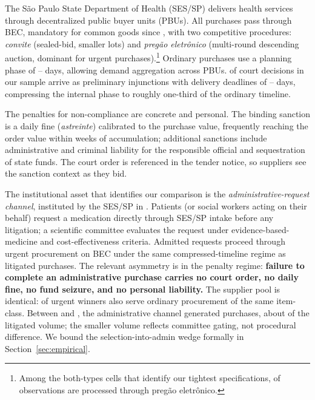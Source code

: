 The S\~ao Paulo State Department of Health (SES/SP) delivers health
services through \BPpbuCount{} decentralized public buyer units
(PBUs). All purchases pass through BEC, mandatory for common goods
since \BPbecMandatorySinceYear, with two competitive procedures:
\textit{convite} (sealed-bid, smaller lots) and \textit{preg\~ao
eletr\^onico} (multi-round descending auction, dominant for urgent
purchases).\footnote{Among the both-types cells that identify our
tightest specifications, \BPbothCellModalityShareBoth{} of
observations are processed through preg\~ao eletr\^onico.} Ordinary
purchases use a planning phase of \BPordPlanLow--\BPordPlanHigh{}
days, allowing demand aggregation across PBUs. \BPinjunctionShare{}
of court decisions in our sample arrive as preliminary injunctions
with delivery deadlines of \BPurgentPlanLow--\BPurgentPlanHigh{}
days, compressing the internal phase to roughly one-third of the
ordinary timeline.

The penalties for non-compliance are concrete and personal. The
binding sanction is a daily fine (\textit{astreinte}) calibrated to
the purchase value, frequently reaching the order value within weeks
of accumulation; additional sanctions include administrative and
criminal liability for the responsible official and sequestration of
state funds. The court order is referenced in the tender notice, so
suppliers see the sanction context as they bid.

The institutional asset that identifies our comparison is the
\textit{administrative-request channel}, instituted by the SES/SP in
\BPsampleStartYear. Patients (or social workers acting on their
behalf) request a medication directly through SES/SP intake before
any litigation; a scientific committee evaluates the request under
evidence-based-medicine and cost-effectiveness criteria. Admitted
requests proceed through urgent procurement on BEC under the same
compressed-timeline regime as litigated purchases. The relevant
asymmetry is in the penalty regime: \textbf{failure to complete an
administrative purchase carries no court order, no daily fine, no
fund seizure, and no personal liability.} The supplier pool is
identical: \BPsupFirmsBothShare{} of urgent winners also serve
ordinary procurement of the same item-class. Between
\BPsampleStartYear{} and \BPsampleEndYear, the administrative channel
generated \BPadminPurchasesTotal{} purchases, about
\BPadminToCourtShare{} of the litigated volume; the smaller volume
reflects committee gating, not procedural difference. We bound the
selection-into-admin wedge formally in Section~\ref{sec:empirical}.


